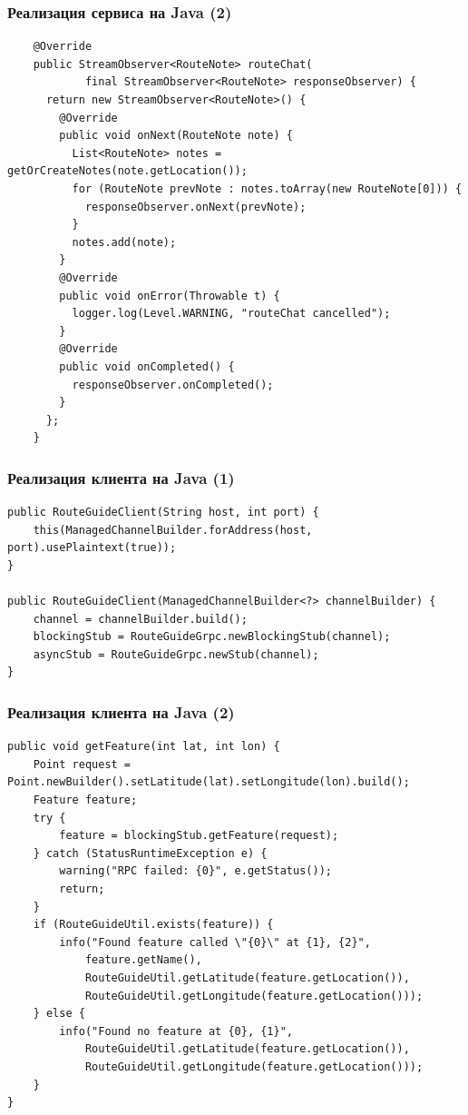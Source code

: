 \documentclass{../../slides-style}
\begin{document}
    \begin{frame}[fragile]
        \frametitle{Реализация сервиса на Java (2)}
        \begin{scriptsize}
            \begin{verbatim}
    @Override
    public StreamObserver<RouteNote> routeChat(
            final StreamObserver<RouteNote> responseObserver) {
      return new StreamObserver<RouteNote>() {
        @Override
        public void onNext(RouteNote note) {
          List<RouteNote> notes = getOrCreateNotes(note.getLocation());
          for (RouteNote prevNote : notes.toArray(new RouteNote[0])) {
            responseObserver.onNext(prevNote);
          }
          notes.add(note);
        }
        @Override
        public void onError(Throwable t) {
          logger.log(Level.WARNING, "routeChat cancelled");
        }
        @Override
        public void onCompleted() {
          responseObserver.onCompleted();
        }
      };
    }
            \end{verbatim}
        \end{scriptsize}
    \end{frame}

    \begin{frame}[fragile]
        \frametitle{Реализация клиента на Java (1)}
        \begin{scriptsize}
            \begin{verbatim}
public RouteGuideClient(String host, int port) {
    this(ManagedChannelBuilder.forAddress(host, port).usePlaintext(true));
}

public RouteGuideClient(ManagedChannelBuilder<?> channelBuilder) {
    channel = channelBuilder.build();
    blockingStub = RouteGuideGrpc.newBlockingStub(channel);
    asyncStub = RouteGuideGrpc.newStub(channel);
}
            \end{verbatim}
        \end{scriptsize}
    \end{frame}

    \begin{frame}[fragile]
        \frametitle{Реализация клиента на Java (2)}
        \begin{scriptsize}
            \begin{verbatim}
public void getFeature(int lat, int lon) {
    Point request = Point.newBuilder().setLatitude(lat).setLongitude(lon).build();
    Feature feature;
    try {
        feature = blockingStub.getFeature(request);
    } catch (StatusRuntimeException e) {
        warning("RPC failed: {0}", e.getStatus());
        return;
    }
    if (RouteGuideUtil.exists(feature)) {
        info("Found feature called \"{0}\" at {1}, {2}",
            feature.getName(),
            RouteGuideUtil.getLatitude(feature.getLocation()),
            RouteGuideUtil.getLongitude(feature.getLocation()));
    } else {
        info("Found no feature at {0}, {1}",
            RouteGuideUtil.getLatitude(feature.getLocation()),
            RouteGuideUtil.getLongitude(feature.getLocation()));
    }
}
            \end{verbatim}
        \end{scriptsize}
    \end{frame}
\end{document}
